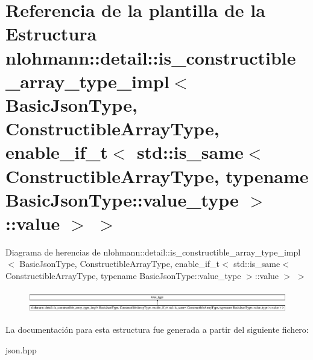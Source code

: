 \hypertarget{structnlohmann_1_1detail_1_1is__constructible__array__type__impl_3_01BasicJsonType_00_01Construce6fa33688da703b95649da4749cdeb98}{}\section{Referencia de la plantilla de la Estructura nlohmann\+:\+:detail\+:\+:is\+\_\+constructible\+\_\+array\+\_\+type\+\_\+impl$<$ Basic\+Json\+Type, Constructible\+Array\+Type, enable\+\_\+if\+\_\+t$<$ std\+:\+:is\+\_\+same$<$ Constructible\+Array\+Type, typename Basic\+Json\+Type\+:\+:value\+\_\+type $>$\+:\+:value $>$ $>$}
\label{structnlohmann_1_1detail_1_1is__constructible__array__type__impl_3_01BasicJsonType_00_01Construce6fa33688da703b95649da4749cdeb98}
Diagrama de herencias de nlohmann\+:\+:detail\+:\+:is\+\_\+constructible\+\_\+array\+\_\+type\+\_\+impl$<$ Basic\+Json\+Type, Constructible\+Array\+Type, enable\+\_\+if\+\_\+t$<$ std\+:\+:is\+\_\+same$<$ Constructible\+Array\+Type, typename Basic\+Json\+Type\+:\+:value\+\_\+type $>$\+:\+:value $>$ $>$\begin{figure}[H]
\begin{center}
\leavevmode
\includegraphics[height=0.985915cm]{structnlohmann_1_1detail_1_1is__constructible__array__type__impl_3_01BasicJsonType_00_01Construce6fa33688da703b95649da4749cdeb98}
\end{center}
\end{figure}


La documentación para esta estructura fue generada a partir del siguiente fichero\+:\begin{DoxyCompactItemize}
\item 
json.\+hpp\end{DoxyCompactItemize}
